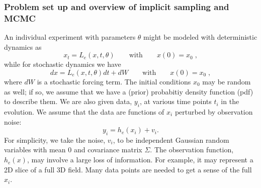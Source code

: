 \documentclass[11pt]{article}
\begin{document}
\subsubsection*{Problem set up and overview of implicit sampling and MCMC}
An individual experiment with parameters $\theta$ might be modeled with deterministic dynamics as
\begin{equation}
\label{eq:ModelEquation}
x_t = L_e(x,t,\theta) \qquad \mathrm{with} \qquad x(0) = x_0 \; ,
\end{equation}
while for stochastic dynamics we have
\begin{equation}
\label{eq:ModelEquationSt}
dx = L_e(x,t,\theta) dt + dW \qquad \mathrm{with} \qquad x(0) = x_0 \; ,
\end{equation}
where $dW$ is a stochastic forcing term. 
The initial conditions $x_0$ may be random as well; if so, we assume that we have a (prior) probabitiy density function (pdf) to describe them.
We are also given data, $y_i$, at various time points $t_i$ in the evolution.
We assume that the data are functions of $x_i$ perturbed by observation noise:
\begin{equation}
	\label{eq:DataEquation}
	y_i = h_e(x_i)+v_i.
\end{equation}
For simplicity, we take the noise, $v_i$, to be independent Gaussian random variables with mean 
$0$ and covariance matrix $\Sigma$.
The observation function, $h_e(x)$, may involve a large loss of information.
For example, it may represent a 2D slice of a full 3D field.
Many data points are needed to get a sense of the full $x_i$.
\end{document}
